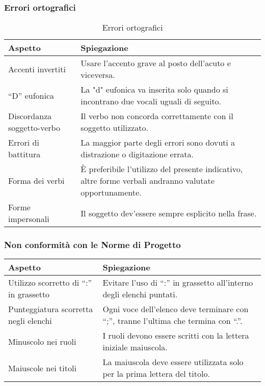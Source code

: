 \subsubsection{Errori ortografici}
\begin{table}[h!]
    \centering
    \renewcommand{\arraystretch}{1.5} %
    \begin{tabularx}{\textwidth}{|p{}|X|}
    \hline
    \rowcolor[HTML]{FFD700}
    \textbf{Aspetto} & \textbf{Spiegazione} \\ \hline
    Accenti invertiti & Usare l'accento grave al posto dell'acuto e viceversa. \\ \hline
    “D” eufonica & La "d" eufonica va inserita solo quando si incontrano due vocali uguali di seguito. \\ \hline
    Discordanza soggetto-verbo & Il verbo non concorda correttamente con il soggetto utilizzato. \\ \hline
    Errori di battitura & La maggior parte degli errori sono dovuti a distrazione o digitazione errata. \\ \hline
    Forma dei verbi  & È preferibile l’utilizzo del presente indicativo, altre forme verbali andranno valutate opportunamente. \\ \hline
    Forme impersonali & Il soggetto dev’essere sempre esplicito nella frase. \\ \hline

    \end{tabularx}
    \caption{Errori ortografici}
\end{table}


\subsubsection{Non conformità con le Norme di Progetto}
\begin{table}[h!]
    \centering
    \renewcommand{\arraystretch}{1.5} %
    \begin{tabularx}{\textwidth}{|p{}|X|}
    \hline
    \rowcolor[HTML]{FFD700}
    \textbf{Aspetto} & \textbf{Spiegazione} \\ \hline
    Utilizzo scorretto di “:” in grassetto & Evitare l'uso di “:” in grassetto all'interno degli elenchi puntati. \\ \hline
    Punteggiatura scorretta negli elenchi & Ogni voce dell'elenco deve terminare con “;”, tranne l'ultima che termina con “.”. \\ \hline
    Minuscolo nei ruoli & I ruoli devono essere scritti con la lettera iniziale maiuscola. \\ \hline
    Maiuscole nei titoli & La maiuscola deve essere utilizzata solo per la prima lettera del titolo. \\ \hline
\end{tabularx}
\end{table}
    

